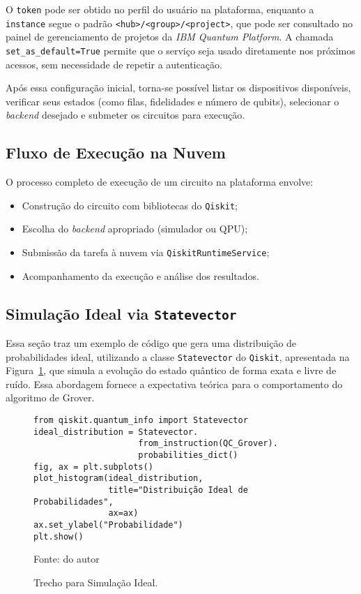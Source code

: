 O \texttt{token} pode ser obtido no perfil do usuário na plataforma, enquanto a \texttt{instance} segue o padrão \texttt{<hub>/<group>/<project>}, que pode ser consultado no painel de gerenciamento de projetos da \textit{IBM Quantum Platform}. A chamada \verb|set_as_default=True| permite que o serviço seja usado diretamente nos próximos acessos, sem necessidade de repetir a autenticação.

Após essa configuração inicial, torna-se possível listar os dispositivos disponíveis, verificar seus estados (como filas, fidelidades e número de qubits), selecionar o \textit{backend} desejado e submeter os circuitos para execução.

\subsection*{Fluxo de Execução na Nuvem}

O processo completo de execução de um circuito na plataforma envolve:

\begin{itemize}
    \item Construção do circuito com bibliotecas do \texttt{Qiskit};
    \item Escolha do \textit{backend} apropriado (simulador ou QPU);
    \item Submissão da tarefa à nuvem via \texttt{QiskitRuntimeService};
    \item Acompanhamento da execução e análise dos resultados.
\end{itemize}

\subsection{Simulação Ideal via \texttt{Statevector}}
\label{subSec: simulacaoIdeal}

Essa seção traz um exemplo de código que gera uma distribuição de probabilidades ideal, utilizando a classe \texttt{Statevector} do \texttt{Qiskit}, apresentada na Figura~\ref{cod: simulacaoIdeol}, que simula a evolução do estado quântico de forma exata e livre de ruído. Essa abordagem fornece a expectativa teórica para o comportamento do algoritmo de Grover.

\begin{figure}[!htb]
\centering
\caption{Trecho para Simulação Ideal.} 
\begin{verbatim}
from qiskit.quantum_info import Statevector
ideal_distribution = Statevector.
                     from_instruction(QC_Grover).
                     probabilities_dict()
fig, ax = plt.subplots()
plot_histogram(ideal_distribution, 
               title="Distribuição Ideal de Probabilidades",
               ax=ax)
ax.set_ylabel("Probabilidade")
plt.show()
\end{verbatim}
{\small Fonte: do autor} 
\label{cod: simulacaoIdeol} 
\end{figure}

